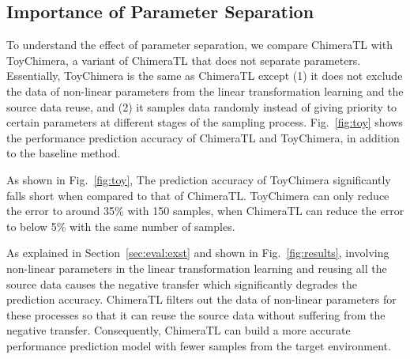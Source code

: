 \subsection{Importance of Parameter Separation}
To understand the effect of parameter separation, we compare ChimeraTL with ToyChimera, a variant of ChimeraTL that does not separate parameters.
Essentially, ToyChimera is the same as ChimeraTL except (1) it does not exclude the data of non-linear parameters from the linear transformation learning and the source data reuse, and (2) it samples data randomly instead of giving priority to certain parameters at different stages of the sampling process.
Fig.~\ref{fig:toy} shows the performance prediction accuracy of ChimeraTL and ToyChimera, in addition to the baseline method.

As shown in Fig.~\ref{fig:toy}, The prediction accuracy of ToyChimera significantly falls short when compared to that of ChimeraTL.
ToyChimera can only reduce the error to around 35\% with 150 samples, when ChimeraTL can reduce the error to below 5\% with the same number of samples.

As explained in Section~\ref{sec:eval:exst} and shown in Fig.~\ref{fig:results}, involving non-linear parameters in the linear transformation learning and reusing all the source data causes the negative transfer which significantly degrades the prediction accuracy.
ChimeraTL filters out the data of non-linear parameters for these processes so that it can reuse the source data without suffering from the negative transfer.
Consequently, ChimeraTL can build a more accurate performance prediction model with fewer samples from the target environment.